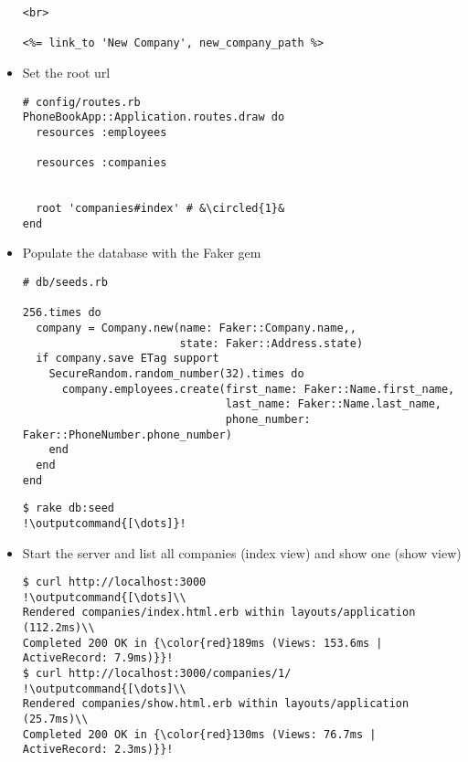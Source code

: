 \documentclass{beamer}
\newcommand*\circled[1]{\tikz[baseline=(char.base)]{
            \node[shape=circle,draw,inner sep=2pt] (char) {#1};}}
\newcommand{\outputcommand}[1]{\color{darkgreen}{#1}}
\begin{document}
\begin{frame}
\begin{itemize}
\begin{lstlisting}[escapechar=&]
<br>

<%= link_to 'New Company', new_company_path %>

\end{lstlisting}

\item Set the root url
\lstset{language=Ruby, style=eclipse}
\begin{lstlisting}[escapechar=&]
# config/routes.rb
PhoneBookApp::Application.routes.draw do
  resources :employees

  resources :companies


  root 'companies#index' # &\circled{1}&
end
\end{lstlisting}

\item Populate the database with the Faker gem
\lstset{language=Ruby, style=eclipse}
\begin{lstlisting}[escapechar=&]
# db/seeds.rb

256.times do
  company = Company.new(name: Faker::Company.name,,
                        state: Faker::Address.state)
  if company.save ETag support 
    SecureRandom.random_number(32).times do
      company.employees.create(first_name: Faker::Name.first_name,
                               last_name: Faker::Name.last_name,
                               phone_number: Faker::PhoneNumber.phone_number)
    end
  end
end
\end{lstlisting}

\lstset{language=shell}
\begin{lstlisting}[escapechar=!]
$ rake db:seed
!\outputcommand{[\dots]}!
\end{lstlisting}

\item Start the server and list all companies (index view) and show one (show view)
\lstset{language=shell}
\begin{lstlisting}[escapechar=!]
$ curl http://localhost:3000
!\outputcommand{[\dots]\\
Rendered companies/index.html.erb within layouts/application (112.2ms)\\
Completed 200 OK in {\color{red}189ms (Views: 153.6ms | ActiveRecord: 7.9ms)}}!
$ curl http://localhost:3000/companies/1/
!\outputcommand{[\dots]\\
Rendered companies/show.html.erb within layouts/application (25.7ms)\\
Completed 200 OK in {\color{red}130ms (Views: 76.7ms | ActiveRecord: 2.3ms)}}!
\end{lstlisting}
\end{itemize}
\end{frame}
\end{document}
